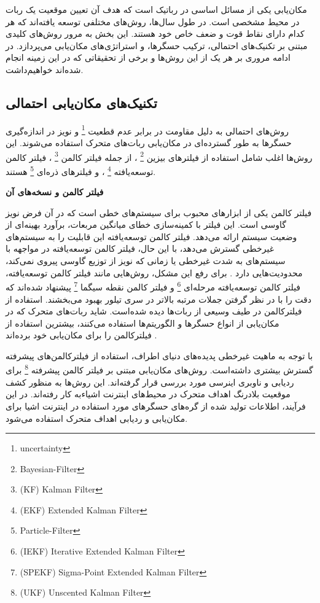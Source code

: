 مکان‌یابی یکی از مسائل اساسی در رباتیک است که هدف آن تعیین موقعیت یک ربات در محیط مشخصی است. در طول سال‌ها، روش‌های مختلفی توسعه یافته‌اند که هر کدام دارای نقاط قوت و ضعف خاص خود هستند. این بخش به مرور روش‌های کلیدی مبتنی بر تکنیک‌های احتمالی، ترکیب حسگرها، و استراتژی‌های مکان‌یابی می‌پردازد. در ادامه مروری بر هر یک از این روش‌ها و برخی از تحقیقاتی که در این زمینه انجام شده‌اند خواهیم‌داشت.


\subsection{تکنیک‌های مکان‌یابی احتمالی}

روش‌های احتمالی به دلیل مقاومت در برابر عدم قطعیت
\footnote{uncertainty}
 و نویز در اندازه‌گیری حسگرها به طور گسترده‌ای در مکان‌یابی ربات‌های متحرک استفاده می‌شوند. این روش‌ها اغلب شامل استفاده از فیلترهای بیزین
\footnote{Bayesian-Filter}
 ، از جمله فیلتر کالمن
\footnote{(KF) Kalman Filter}
، فیلتر کالمن توسعه‌یافته
\footnote{(EKF) Extended Kalman Filter}
، و فیلترهای ذره‌ای
\footnote{Particle-Filter}
 هستند.


\textbf {فیلتر کالمن و نسخه‌های آن}

فیلتر کالمن یکی از ابزارهای محبوب برای سیستم‌های خطی است که در آن فرض نویز گاوسی است. این فیلتر با کمینه‌سازی خطای میانگین مربعات، برآورد بهینه‌ای از وضعیت سیستم ارائه می‌دهد. فیلتر کالمن توسعه‌یافته این قابلیت را به سیستم‌های غیرخطی گسترش می‌دهد، با این حال،  فیلتر کالمن توسعه‌یافته در مواجهه با سیستم‌های به شدت غیرخطی یا زمانی که نویز از توزیع گاوسی پیروی نمی‌کند، محدودیت‌هایی دارد
\cite{burgard1997active}
. برای رفع این مشکل، روش‌هایی مانند فیلتر کالمن توسعه‌یافته، فیلتر کالمن توسعه‌یافته مرحله‌ای
\footnote{(IEKF) Iterative Extended Kalman Filter}
 و فیلتر کالمن نقطه سیگما
 \footnote{(SPEKF) Sigma-Point Extended Kalman Filter}
  پیشنهاد شده‌اند که دقت را با در نظر گرفتن جملات مرتبه بالاتر در سری تیلور بهبود می‌بخشند.
استفاده از فیلترکالمن در طیف وسیعی از ربات‌ها دیده‌ شده‌است. شاید ربات‌های متحرک که در مکان‌یابی از انواع حسگر‌ها و الگوریتم‌ها استفاده می‌کنند، بیشترین‌ استفاد‌ه از فیلترکالمن را برای مکان‌یابی خود برده‌اند
\cite{liu2021cost, lin2018topological, negenborn2003robot}. 

با توجه به ماهیت غیرخطی پدیده‌های دنیای اطراف، استفاده از فیلترکالمن‌های پیشرفته گسترش بیشتری داشته‌است. 
\cite{zhan2007iterated, guo2014square, xian2016square, filtermobile} 
 روش‌های مکان‌یابی مبتنی بر فیلتر کالمن پیشرفته
\footnote{(UKF) Unscented Kalman Filter}
  برای ردیابی و ناوبری اینرسی مورد بررسی قرار گرفته‌اند. این روش‌ها به منظور کشف موقعیت بلادرنگ اهداف متحرک در محیط‌های اینترنت اشیاءبه کار رفته‌اند. در این فرآیند، اطلاعات تولید شده از گره‌های حسگرهای مورد استفاده در اینترنت اشیا برای مکان‌یابی و ردیابی اهداف متحرک استفاده می‌شود.
  
